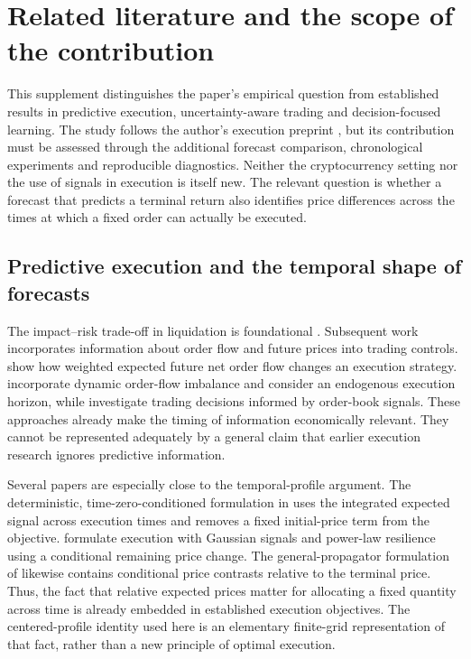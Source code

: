 \section{Related literature and the scope of the contribution}
\label{sec:extended-literature}

This supplement distinguishes the paper's empirical question from established results in predictive execution, uncertainty-aware trading and decision-focused learning. The study follows the author's execution preprint \citep{lai2026}, but its contribution must be assessed through the additional forecast comparison, chronological experiments and reproducible diagnostics. Neither the cryptocurrency setting nor the use of signals in execution is itself new. The relevant question is whether a forecast that predicts a terminal return also identifies price differences across the times at which a fixed order can actually be executed.

\subsection{Predictive execution and the temporal shape of forecasts}

The impact--risk trade-off in liquidation is foundational \citep{almgren2001}. Subsequent work incorporates information about order flow and future prices into trading controls. \citet{cartea2016} show how weighted expected future net order flow changes an execution strategy. \citet{bechler2015} incorporate dynamic order-flow imbalance and consider an endogenous execution horizon, while \citet{cartea2018} investigate trading decisions informed by order-book signals. These approaches already make the timing of information economically relevant. They cannot be represented adequately by a general claim that earlier execution research ignores predictive information.

Several papers are especially close to the temporal-profile argument. The deterministic, time-zero-conditioned formulation in \citet{lehalle2019} uses the integrated expected signal across execution times and removes a fixed initial-price term from the objective. \citet{forde2022} formulate execution with Gaussian signals and power-law resilience using a conditional remaining price change. The general-propagator formulation of \citet{abijaber2025} likewise contains conditional price contrasts relative to the terminal price. Thus, the fact that relative expected prices matter for allocating a fixed quantity across time is already embedded in established execution objectives. The centered-profile identity used here is an elementary finite-grid representation of that fact, rather than a new principle of optimal execution.

